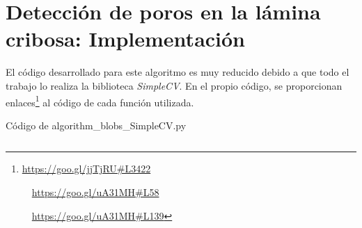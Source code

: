\chapter{Detección de poros en la lámina cribosa: Implementación}

El código desarrollado para este algoritmo es muy reducido debido a
que todo el trabajo lo realiza la biblioteca \emph{SimpleCV}. En el
propio código, se proporcionan
enlaces\footnote{\url{https://goo.gl/jjTjRU\#L3422}
  \par~~\url{https://goo.gl/uA31MH\#L58}
  \par~~\url{https://goo.gl/uA31MH\#L139}}
al código de cada función utilizada.
\begin{codigo_python}
\caption{Código de algorithm\_blobs\_SimpleCV.py}
  \inputminted[fontsize=\scriptsize, linenos, breaklines]{python}{../OpenCV/algorithm_blobs_SimpleCV.py}
\end{codigo_python}